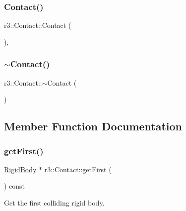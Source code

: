 \subsubsection{\texorpdfstring{Contact()}{Contact()}}
{\footnotesize\ttfamily r3\+::\+Contact\+::\+Contact (\begin{DoxyParamCaption}{ }\end{DoxyParamCaption})\hspace{0.3cm}{\ttfamily [explicit]}, {\ttfamily [default]}}

\mbox{\label{classr3_1_1_contact_a011905bfa1cfa3ed459650796b105c6a}} 
\subsubsection{\texorpdfstring{$\sim$\+Contact()}{~Contact()}}
{\footnotesize\ttfamily r3\+::\+Contact\+::$\sim$\+Contact (\begin{DoxyParamCaption}{ }\end{DoxyParamCaption})\hspace{0.3cm}{\ttfamily [default]}}



\subsection{Member Function Documentation}
\mbox{\label{classr3_1_1_contact_adf157981ebfd1552521afe7b25e9239c}} 
\subsubsection{\texorpdfstring{get\+First()}{getFirst()}}
{\footnotesize\ttfamily \mbox{\hyperlink{classr3_1_1_rigid_body}{Rigid\+Body}} $\ast$ r3\+::\+Contact\+::get\+First (\begin{DoxyParamCaption}{ }\end{DoxyParamCaption}) const}

Get the first colliding rigid body. \mbox{\label{classr3_1_1_contact_a90af8f5c7cba65a6a84c57b5a6ef6d70}} 
